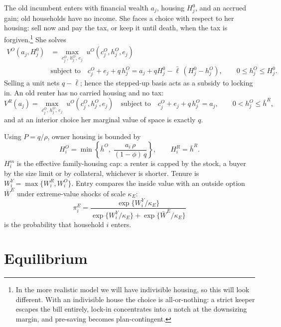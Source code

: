 \documentclass[11pt]{article}
\begin{document}
The old incumbent enters with financial wealth $a_j$, housing $H_j^0$, and an accrued gain; old households have no income. She faces a choice with respect to her housing: sell now and pay the tax, or keep it until death, when the tax is forgiven.\footnote{In the more realistic model we will have indivisible housing, so this will look different. With an indivisible house the choice is all-or-nothing: a strict keeper escapes the bill entirely, lock-in concentrates into a notch at the downsizing margin, and pre-saving becomes plan-contingent.} She solves
\[
\begin{aligned}
V^O(a_j,H_j^0)
&=\max_{c_j^O,\,h_j^O,\,e_j}\;u^O(c_j^O,h_j^O,e_j)
\\
&\text{subject to}\quad
c_j^O+e_j+q\,h_j^O=a_j+qH_j^0-\bar\ell\,(H_j^0-h_j^O),
\qquad
0\le h_j^O\le H_j^0 .
\end{aligned}
\]
Selling a unit nets $q-\bar\ell$; hence the stepped-up basis acts as a subsidy to locking in. An old renter has no carried housing and no tax:
\[
V^R(a_j)
=\max_{c_j^O,\,h_j^O,\,e_j}\;u^O(c_j^O,h_j^O,e_j)
\quad\text{subject to}\quad
c_j^O+e_j+q\,h_j^O=a_j,
\qquad
0<h_j^O\le\bar h^R ,
\]
and at an interior choice her marginal value of space is exactly $q$.

Using $P=q/\rho$, owner housing is bounded by
\[
H_i^O=\min\left\{\bar h^O,\;\frac{a_i\,\rho}{(1-\phi)\,q}\right\},
\qquad
H_i^R=\bar h^R .
\]
$H_i^m$ is the effective family-housing cap: a renter is capped by the stock, a buyer by the size limit or by collateral, whichever is shorter. Tenure is $W_i^Y=\max\{W_i^R,W_i^O\}$. Entry compares the inside value with an outside option $\bar W^E$ under extreme-value shocks of scale $\kappa_E$:
\[
\pi_i^E=\frac{\exp\{W_i^Y/\kappa_E\}}{\exp\{W_i^Y/\kappa_E\}+\exp\{\bar W^E/\kappa_E\}}
\]
is the probability that household $i$ enters.

\section{Equilibrium}
\end{document}
